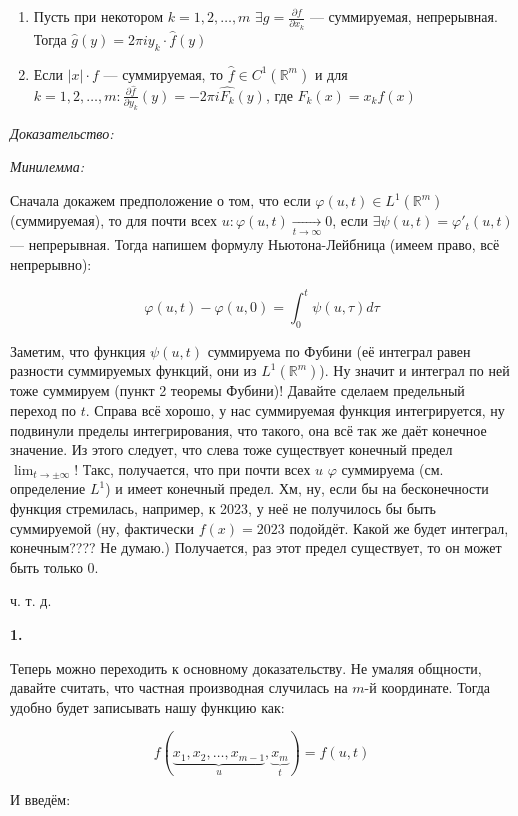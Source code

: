 \documentclass{article}
\def\dbl{\,\,}
\def\goesto#1{\underset{#1}{\longrightarrow}}
\begin{document}
\begin{enumerate}
    \item Пусть при некотором $k = 1, 2, \ldots, m \dbl \exists g = \frac{\partial f}{\partial x_k}$ --- суммируемая, непрерывная. Тогда $\hat{g}(y) = 2 \pi i y_k \cdot \hat{f}(y)$
    \item Если $|x| \cdot f$ --- суммируемая, то $\hat{f} \in C^1(\mathbb{R}^m)$ и для $k = 1, 2, \ldots, m: \frac{\partial \hat{f}}{\partial y_k}(y) = -2\pi i \hat{F_k}(y)$, где $F_k(x) = x_kf(x)$
\end{enumerate}

\textit{Доказательство:}

\textit{Минилемма:}

Сначала докажем предположение о том, что если $\varphi(u, t) \in L^1(\mathbb{R}^m)$ (суммируемая), то для почти всех $u : \varphi(u, t) \goesto{t \rightarrow \infty} 0$, если $\exists \psi(u, t) = \varphi'_t(u, t)$ --- непрерывная. Тогда напишем формулу Ньютона-Лейбница (имеем право, всё непрерывно):

\[\varphi(u, t) - \varphi(u, 0) = \int_{0}^{t} \psi(u, \tau) d\tau \]

Заметим, что функция $\psi(u, t)$ суммируема по Фубини (её интеграл равен разности суммируемых функций, они из $L^1(\mathbb{R}^m)$). Ну значит и интеграл по ней тоже суммируем (пункт 2 теоремы Фубини)! Давайте сделаем предельный переход по $t$. Справа всё хорошо, у нас суммируемая функция интегрируется, ну подвинули пределы интегрирования, что такого, она всё так же даёт конечное значение. Из этого следует, что слева тоже существует конечный предел $\lim_{t \rightarrow \pm \infty}$! Такс, получается, что при почти всех $u \dbl \varphi$ суммируема (см. определение $L^1$) и имеет конечный предел. Хм, ну, если бы на бесконечности функция стремилась, например, к 2023, у неё не получилось бы быть суммируемой (ну, фактически $f(x) = 2023$ подойдёт. Какой же будет интеграл, конечным???? Не думаю.) Получается, раз этот предел существует, то он может быть только 0.

ч. т. д. 

\textbf{1.}

Теперь можно переходить к основному доказательству. Не умаляя общности, давайте считать, что частная производная случилась на $m$-й координате. Тогда удобно будет записывать нашу функцию как:

\[f(\underbrace{x_1, x_2, \ldots, x_{m - 1}}_{u}, \underbrace{x_m}_{t}) = f(u, t)\]

И введём:
\end{document}
